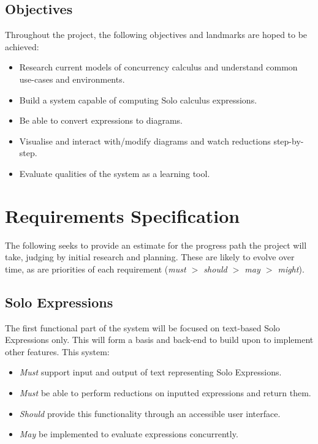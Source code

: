 \documentclass{article}
\begin{document}
\subsection{Objectives}
Throughout the project, the following objectives and landmarks are hoped to be achieved:
\begin{itemize}
	\item Research current models of concurrency calculus and understand common use-cases and environments.
	\item Build a system capable of computing Solo calculus expressions.
	\item Be able to convert expressions to diagrams.
	\item Visualise and interact with/modify diagrams and watch reductions step-by-step.
	\item Evaluate qualities of the system as a learning tool.
\end{itemize}


\section{Requirements Specification}
The following seeks to provide an estimate for the progress path the project will take, judging by initial research and planning. These are likely to evolve over time, as are priorities of each requirement (\textit{must $>$ should $>$ may $>$ might}).

\subsection{Solo Expressions}\label{subsec:Solo_expr_reqs}
The first functional part of the system will be focused on text-based Solo Expressions only. This will form a basis and back-end to build upon to implement other features.
This system:
\begin{itemize}
	\item \textit{Must} support input and output of text representing Solo Expressions.
	\item \textit{Must} be able to perform reductions on inputted expressions and return them.
	\item \textit{Should} provide this functionality through an accessible user interface.
	\item \textit{May} be implemented to evaluate expressions concurrently.
\end{itemize}
\end{document}
